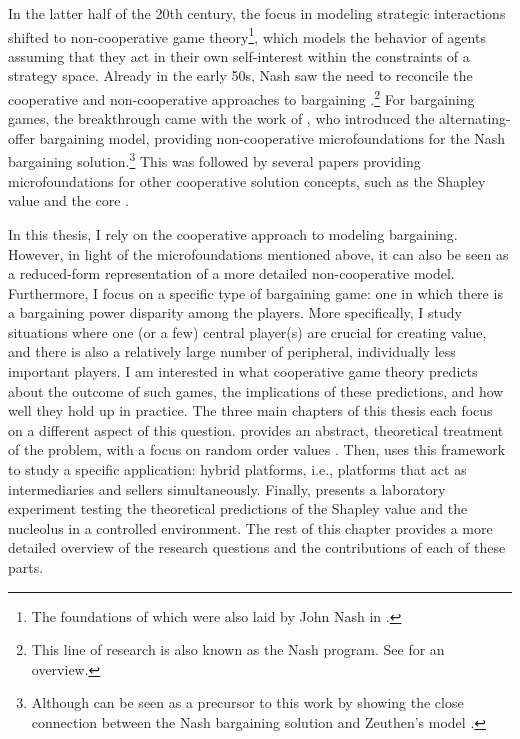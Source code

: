 In the latter half of the 20th century, the focus in modeling strategic interactions shifted to non-cooperative game theory\footnote{
    The foundations of which were also laid by John Nash in \textcite{nash1950non}.
}, which models the behavior of agents assuming that they act in their own self-interest within the constraints of a strategy space.
Already in the early 50s, Nash saw the need to reconcile the cooperative and non-cooperative approaches to bargaining \parencite{nash1953two}.\footnote{
    This line of research is also known as the Nash program.
    See \textcite{serrano2021sixty} for an overview.
}
For bargaining games, the breakthrough came with the work of \textcite{rubinstein1982perfect}, who introduced the alternating-offer bargaining model, providing non-cooperative microfoundations for the Nash bargaining solution.\footnote{
    Although \textcite{harsanyi1956approaches} can be seen as a precursor to this work by showing the close connection between the Nash bargaining solution \parencite{nash1950bargaining} and Zeuthen's model \parencite{zeuthen1930problems}.
}
This was followed by several papers providing microfoundations for other cooperative solution concepts, such as the Shapley value \parencite[e.g.,][]{gul1989bargaining,winter1994demand,hart1996bargaining,stole1996intra} and the core \parencite[e.g.,][]{serrano1995market}.

In this thesis, I rely on the cooperative approach to modeling bargaining.
However, in light of the microfoundations mentioned above, it can also be seen as a reduced-form representation of a more detailed non-cooperative model.
Furthermore, I focus on a specific type of bargaining game: one in which there is a bargaining power disparity among the players.
More specifically, I study situations where one (or a few) central player(s) are crucial for creating value, and there is also a relatively large number of peripheral, individually less important players.
I am interested in what cooperative game theory predicts about the outcome of such games, the implications of these predictions, and how well they hold up in practice.
The three main chapters of this thesis each focus on a different aspect of this question.
 provides an abstract, theoretical treatment of the problem, with a focus on random order values \parencite{weber1988probabilistic}. Then,  uses this framework to study a specific application: hybrid platforms, i.e., platforms that act as intermediaries and sellers simultaneously.
Finally,  presents a laboratory experiment testing the theoretical predictions of the Shapley value and the nucleolus in a controlled environment.
The rest of this chapter provides a more detailed overview of the research questions and the contributions of each of these parts.

